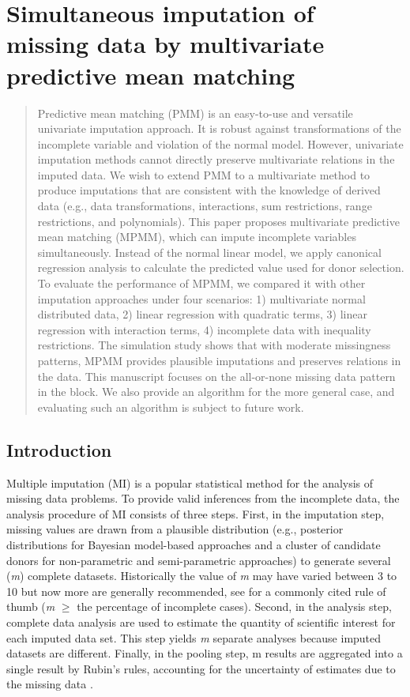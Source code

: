 \chapter{Simultaneous imputation of missing data by multivariate predictive mean matching}
\label{chap3}
	\begin{abstract}
		Predictive mean matching (PMM) is an easy-to-use and versatile univariate imputation approach. It is robust against transformations of the incomplete variable and violation of the normal model. However, univariate imputation methods cannot directly preserve multivariate relations in the imputed data. We wish to extend PMM to a multivariate method to produce imputations that are consistent with the knowledge of derived data (e.g., data transformations, interactions, sum restrictions, range restrictions, and polynomials). This paper proposes multivariate predictive mean matching (MPMM), which can impute incomplete variables simultaneously. Instead of the normal linear model, we apply canonical regression analysis to calculate the predicted value used for donor selection. To evaluate the performance of MPMM, we compared it with other imputation approaches under four scenarios: 1) multivariate normal distributed data, 2) linear regression with quadratic terms, 3) linear regression with interaction terms, 4) incomplete data with inequality restrictions. The simulation study shows that with moderate missingness patterns, MPMM provides plausible imputations and preserves relations in the data. This manuscript focuses on the all-or-none missing data pattern in the block. We also provide an algorithm for the more general case, and evaluating such an algorithm is subject to future work.   
	\end{abstract}

	\section{Introduction}
	\label{sec:3.1}
	Multiple imputation (MI) is a popular statistical method for the analysis of missing data problems. To provide valid inferences from the incomplete data, the analysis procedure of MI consists of three steps. First, in the imputation step, missing values are drawn from a plausible distribution (e.g., posterior distributions for Bayesian model-based approaches and a cluster of candidate donors for non-parametric and semi-parametric approaches) to generate several (\emph{m}) complete datasets. Historically the value of \emph{m} may have varied between 3 to 10 but now more are generally recommended, see \citet{white2011multiple} for a commonly cited rule of thumb (\emph{m} $\geq$ the percentage of incomplete cases). Second, in the analysis step, complete data analysis are used to estimate the quantity of scientific interest for each imputed data set. This step yields \emph{m} separate analyses because imputed datasets are different. Finally, in the pooling step, m results are aggregated into a single result by Rubin’s rules, accounting for the uncertainty of estimates due to the missing data \citep[p.76]{RubinD1987}. 
	
